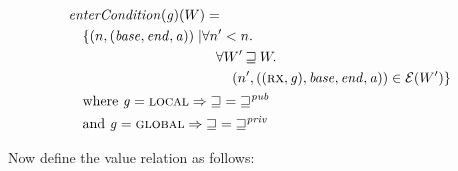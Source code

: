 \documentclass[a4paper]{article}
\newcommand{\var}[1]{\mathit{#1}}
\newcommand{\gl}{\var{g}}
\newcommand{\addr}{\var{a}}
\newcommand{\start}{\var{base}}
\newcommand{\addrend}{\var{end}}
\newcommand{\plainfun}[2]{
  \ifthenelse{\equal{#2}{}}
  {\mathit{#1}}
  {\mathit{#1}(#2)}
}
\newcommand{\entryCond}[1]{\plainfun{enterCondition}{#1}}
\newcommand{\future}{\mathbin{\sqsupseteq}}
\newcommand{\futurewk}{\mathbin{\sqsupseteq}^{\var{pub}}}
\newcommand{\futurestr}{\mathbin{\sqsupseteq}^{\var{priv}}}
\newcommand{\asmType}{\plaindom{AsmType}}
\newcommand{\plaindom}[1]{\mathrm{#1}}
\newcommand{\intr}[2]{\mathcal{#1}}
\newcommand{\exprintr}[1]{\intr{E}{#1}}
\newcommand{\stder}{\exprintr{\asmType}}
\newcommand{\npair}[2][n]{\left(#1,#2 \right)}
\newcommand{\plainperm}[1]{\textsc{#1}}
\newcommand{\exec}{\plainperm{rx}}
\newcommand{\local}{\plainperm{local}}
\newcommand{\glob}{\plainperm{global}}
\begin{document}
\begin{align*}
  & \entryCond{}(\gl)(W) = \\
  & \quad
    \begin{aligned}[t]
      \{ \npair{(\start,\addrend,\addr)} \mid &  \forall n' < n \ldotp\\
      & \quad \forall W' \future W \ldotp\\
      & \qquad \npair[n']{((\exec,\gl),\start,\addrend,\addr)} \in \stder(W')\}
    \end{aligned} \\
  & \quad \text{where } \gl = \local \Rightarrow \future = \futurewk \\
  & \quad \text{and } \gl = \glob \Rightarrow \future = \futurestr
\end{align*}

Now define the value relation as follows:
\end{document}
